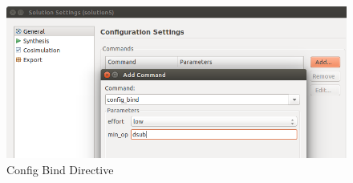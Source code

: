\begin{figure}[h]
\centering
\includegraphics[scale=0.5]{figures/config_bind.png}
\caption{Config Bind Directive}
\label{fig:configbind}
\end{figure}